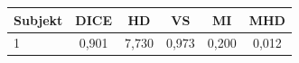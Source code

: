 \begin{tabular}{l c c c c c}
 \hline
Subjekt & DICE & HD & VS & MI & MHD \\ \hline
1 & 0,901 & 7,730 & 0,973 & 0,200 & 0,012 \\
\hline 
 \end{tabular}
